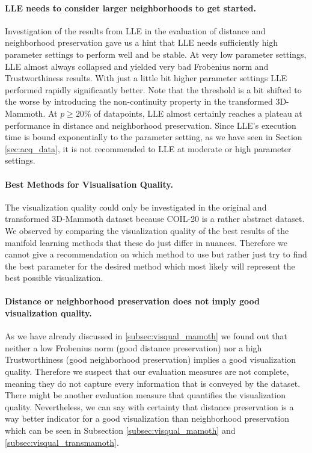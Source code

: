 \paragraph{LLE needs to consider larger neighborhoods to get started.}
Investigation of the results from LLE in the evaluation of distance and neighborhood preservation gave us a hint that LLE needs sufficiently high parameter settings to perform well and be stable. At very low parameter settings, LLE almost always collapsed and yielded very bad Frobenius norm and Trustworthiness results. With just a little bit higher parameter settings LLE performed rapidly significantly better. Note that the threshold is a bit shifted to the worse by introducing the non-continuity property in the transformed 3D-Mammoth. At $p\geq20\%$ of datapoints, LLE almost certainly reaches a plateau at performance in distance and neighborhood preservation. Since LLE's execution time is bound exponentially to the parameter setting, as we have seen in Section \ref{sec:acq_data}, it is not recommended to LLE at moderate or high parameter settings.

\paragraph{Best Methods for Visualisation Quality.}
The visualization quality could only be investigated in the original and transformed 3D-Mammoth dataset because COIL-20 is a rather abstract dataset. We observed by comparing the visualization quality of the best results of the manifold learning methods that these do just differ in nuances. Therefore we cannot give a recommendation on which method to use but rather just try to find the best parameter for the desired method which most likely will represent the best possible visualization.

\paragraph{Distance or neighborhood preservation does not imply good visualization quality.}
As we have already discussed in \ref{subsec:visqual_mamoth} we found out that neither a low Frobenius norm (good distance preservation) nor a high Trustworthiness (good neighborhood preservation) implies a good visualization quality. Therefore we suspect that our evaluation measures are not complete, meaning they do not capture every information that is conveyed by the dataset. There might be another evaluation measure that quantifies the visualization quality. Nevertheless, we can say with certainty that distance preservation is a way better indicator for a good visualization than neighborhood preservation which can be seen in Subsection \ref{subsec:visqual_mamoth} and \ref{subsec:visqual_transmamoth}.

